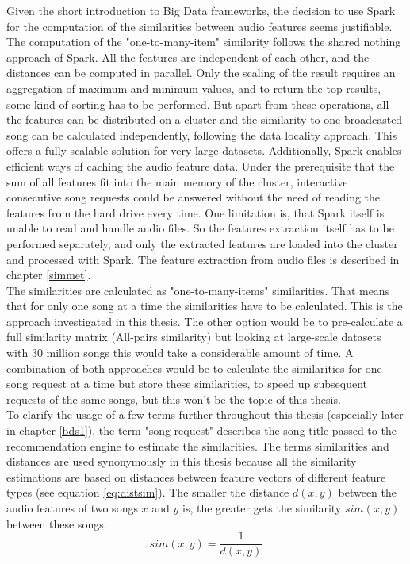 Given the short introduction to Big Data frameworks, the decision to use Spark for the computation of the similarities between audio features seems justifiable. The computation of the "one-to-many-item" similarity follows the shared nothing approach of Spark. All the features are independent of each other, and the distances can be computed in parallel. Only the scaling of the result requires an aggregation of maximum and minimum values, and to return the top results, some kind of sorting has to be performed. But apart from these operations, all the features can be distributed on a cluster and the similarity to one broadcasted song can be calculated independently, following the data locality approach. This offers a fully scalable solution for very large datasets. Additionally, Spark enables efficient ways of caching the audio feature data. Under the prerequisite that the sum of all features fit into the main memory of the cluster, interactive consecutive song requests could be answered without the need of reading the features from the hard drive every time.
One limitation is, that Spark itself is unable to read and handle audio files. So the features extraction itself has to be performed separately, and only the extracted features are loaded into the cluster and processed with Spark. The feature extraction from audio files is described in chapter \ref{simmet}.\\
The similarities are calculated as "one-to-many-items" similarities. That means that for only one song at a time the similarities have to be calculated. This is the approach investigated in this thesis. The other option would be to pre-calculate a full similarity matrix (All-pairs similarity) but looking at large-scale datasets with 30 million songs this would take a considerable amount of time. A combination of both approaches would be to calculate the similarities for one song request at a time but store these similarities, to speed up subsequent requests of the same songs, but this won't be the topic of this thesis.\\ 
To clarify the usage of a few terms further throughout this thesis (especially later in chapter \ref{bds1}), the term "song request" describes the song title passed to the recommendation engine to estimate the similarities. The terms similarities and distances are used synonymously in this thesis because all the similarity estimations are based on distances between feature vectors of different feature types (see equation \ref{eq:distsim}). The smaller the distance $d(x, y)$ between the audio features of two songs $x$ and $y$ is, the greater gets the similarity $sim(x, y)$ between these songs.\\
\begin{equation} \label{eq:distsim}
sim(x, y) = \frac{1}{d(x, y)}
\end{equation}

